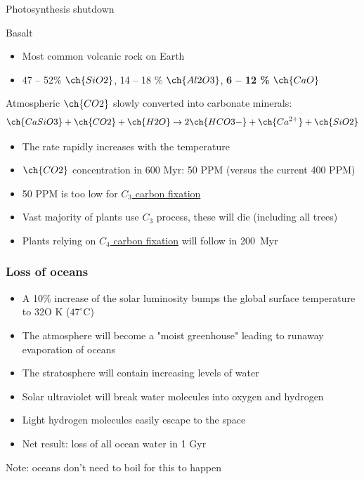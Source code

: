\documentclass[aspectratio=169]{beamer}
\begin{document}
\begin{frame}{Photosynthesis shutdown}
\begin{block}{Basalt}
\begin{itemize}
\item Most common volcanic rock on Earth
\item 47 -- 52\% $\ch{SiO2}$, 14 -- 18 \% $\ch{Al2O3}$, {\bf 6 -- 12 \%} $\ch{CaO}$
\end{itemize}
\end{block}
Atmospheric $\ch{CO2}$ slowly converted into carbonate minerals:
\begin{displaymath}
\nonumber
\ch{CaSiO3} + \ch{CO2} + \ch{H2O} \to 2 \ch{HCO3-} + \ch{Ca^{2+}} + \ch{SiO2}
\end{displaymath}

\begin{itemize}
\item The rate rapidly increases with the temperature
\item $\ch{CO2}$ concentration in 600 Myr: 50 PPM \cite{arXiv:0912.2482} (versus the current 400 PPM)
\item 50 PPM is too low for \href{http://en.wikipedia.org/wiki/C3_carbon_fixation}{$C_3$ carbon fixation}
\item Vast majority of plants use $C_3$ process, these will die (including all trees)
\item Plants relying on \href{http://en.wikipedia.org/wiki/C4_carbon_fixation}{$C_4$ carbon fixation} will follow in 200~Myr
\end{itemize}
\end{frame}


\begin{frame}
\frametitle{Loss of oceans}
\begin{itemize}
\item A 10\% increase of the solar luminosity bumps the global surface temperature to 32O K ($47^\circ \mathrm{C}$)
\item The atmosphere will become a "moist greenhouse" leading to runaway
  evaporation of oceans \cite{James F. Kasting}
\item The stratosphere will contain increasing levels of water
\item Solar ultraviolet will break water molecules into oxygen and hydrogen
\item Light hydrogen molecules easily escape to the space
\item Net result: loss of all ocean water in 1 Gyr
\end{itemize}

Note: oceans don't need to boil for this to happen
\end{frame}
\end{document}
